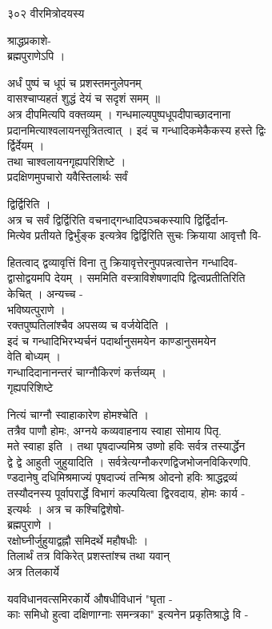 \documentclass[11pt, openany]{book}
\begin{document}
{{{{{{{{{{{{{{३०२ }{वीरमित्रोदयस्य}{ श्राद्धप्रकाशे-\\
ब्रह्मपुराणेऽपि ।

{ अर्धं पुष्पं च धूपं च प्रशस्तमनुलेपनम् \textbar{}\\
वासश्चाप्यहतं शुद्धं देयं च सदृशं समम् ॥\\
अत्र दीपमित्यपि वक्तव्यम् । गन्धमाल्यपुष्पधूपदीपाच्छादनाना\\
प्रदानमित्याश्वलायनसूत्रितत्वात् । इदं च गन्धादिकमेकैकस्य हस्ते द्विः\\
र्द्विर्देयम् ।\\
तथा चाश्वलायनगृह्यपरिशिष्टे ।\\
प्रदक्षिणमुपचारो यवैस्तिलार्थः }{सर्वं}{ द्विर्द्विरिति ।\\
अत्र च सर्वं द्विर्द्विरिति वचनाद्गन्धादिपञ्चकस्यापि
द्विर्द्विर्दान-\\
मित्येव प्रतीयते द्विर्भुंङ्क इत्यत्रेव द्विर्द्विरिति सुचः क्रियाया
आवृत्तौ वि-

हितत्वाद् द्वव्यावृत्तिं विना तु क्रियावृत्तेरनुपपन्नत्वात्तेन
गन्धादिव-\\
द्वासोद्वयमपि देयम् । सममिति वस्त्राविशेषणादपि द्वित्वप्रतीतिरिति\\
केचित् । अन्यच्च -\\
भविष्यत्पुराणे ।\\
रक्तपुष्पतिलांश्चैव अपसव्य च वर्जयेदिति ।\\
इदं च गन्धादिभिरभ्यर्चनं पदार्थानुसमयेन काण्डानुसमयेन\\
वेति बोध्यम् ।\\
गन्धादिदानानन्तरं चाग्नौकिरणं कर्त्तव्यम् ।\\
गृह्यपरिशिष्टे

{ नित्यं चाग्नौ स्वाहाकारेण होमश्चेति ।\\
तत्रैव पाणौ होमः, अग्नये कव्यवाहनाय }{स्वाहा}{ \textbar{} सोमाय पितृ.\\
मते }{स्वाहा}{ इति । तथा पृषदाज्यमिश्र उष्णो हविः सर्वत्र तस्यार्द्धेन\\
द्वे द्वे आहुती जुहुयादिति । सर्वत्रेत्यग्नौकरणद्विजभोजनविकिरणपि.\\
ण्डदानेषु दधिमिश्रमाज्यं पृषदाज्यं तन्मिश्र ओदनो हविः श्राद्धद्रव्यं\\
तस्यौदनस्य पूर्वापरार्द्धे विभागं कल्पयित्वा द्विरवदाय, होमः कार्य -\\
इत्यर्थः । अत्र च कश्चिद्विशेषो-\\
ब्रह्मपुराणे ।\\
रक्षोघ्नीर्जुहुयाद्वह्नौ समिदर्थे महौषधीः ।\\
तिलार्थं तत्र विकिरेत् प्रशस्तांश्च तथा यवान् \textbar{}\textbar{}\\
अत्र }{तिलकार्ये}{ यवविधानवत्समिरकार्ये औषधीविधानं "घृता -\\
काः समिधो हुत्वा दक्षिणाग्नाः समन्त्रका" इत्यनेन प्रकृतिश्राद्धे वि -

}}}}}}}}}}}}}}}}
\end{document}
